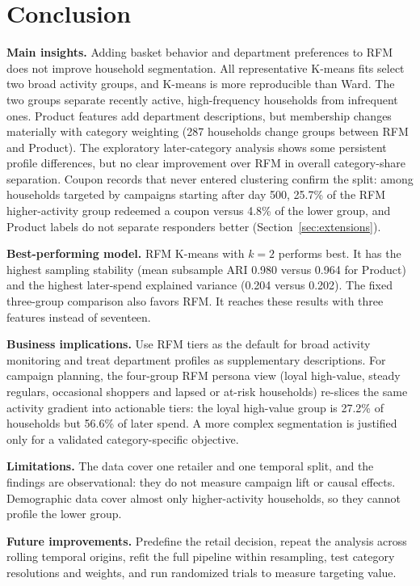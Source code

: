 \section{Conclusion}
\textbf{Main insights.} Adding basket behavior and department preferences to RFM does not improve household segmentation. All representative K-means fits select two broad activity groups, and K-means is more reproducible than Ward. The two groups separate recently active, high-frequency households from infrequent ones. Product features add department descriptions, but membership changes materially with category weighting (287 households change groups between RFM and Product). The exploratory later-category analysis shows some persistent profile differences, but no clear improvement over RFM in overall category-share separation. Coupon records that never entered clustering confirm the split: among households targeted by campaigns starting after day 500, 25.7\% of the RFM higher-activity group redeemed a coupon versus 4.8\% of the lower group, and Product labels do not separate responders better (Section~\ref{sec:extensions}).

\textbf{Best-performing model.} RFM K-means with $k=2$ performs best. It has the highest sampling stability (mean subsample ARI 0.980 versus 0.964 for Product) and the highest later-spend explained variance (0.204 versus 0.202). The fixed three-group comparison also favors RFM. It reaches these results with three features instead of seventeen.

\textbf{Business implications.} Use RFM tiers as the default for broad activity monitoring and treat department profiles as supplementary descriptions. For campaign planning, the four-group RFM persona view (loyal high-value, steady regulars, occasional shoppers and lapsed or at-risk households) re-slices the same activity gradient into actionable tiers: the loyal high-value group is 27.2\% of households but 56.6\% of later spend. A more complex segmentation is justified only for a validated category-specific objective.

\textbf{Limitations.} The data cover one retailer and one temporal split, and the findings are observational: they do not measure campaign lift or causal effects. Demographic data cover almost only higher-activity households, so they cannot profile the lower group.

\textbf{Future improvements.} Predefine the retail decision, repeat the analysis across rolling temporal origins, refit the full pipeline within resampling, test category resolutions and weights, and run randomized trials to measure targeting value.
